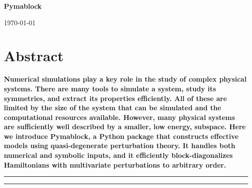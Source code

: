 \documentclass[submission, Codebases]{SciPost}
\begin{document}
\begin{center}
{\Large \textbf{Pymablock}}
\end{center}

\author[1\thanks{\texttt{myemail@gmail.com}}]{person
        }
\author[2]{personita
        }

\begin{center}
    \today
\end{center}

\section*{Abstract}
{\bf
Numerical simulations play a key role in the study of complex physical systems.
There are many tools to simulate a system, study its symmetries, and extract its properties efficiently.
All of these are limited by the size of the system that can be simulated and the computational resources available.
However, many physical systems are sufficiently well described by a smaller, low energy, subspace.
Here we introduce Pymablock, a Python package that constructs effective models using quasi-degenerate perturbation theory.
It handles both numerical and symbolic inputs, and it efficiently block-diagonalizes Hamiltonians with multivariate perturbations to arbitrary order.
}

\vspace{10pt}
\noindent\rule{\textwidth}{1pt}
\tableofcontents\thispagestyle{fancy}
\noindent\rule{\textwidth}{1pt}
\vspace{10pt}








\printglossaries





\nolinenumbers
\end{document}
